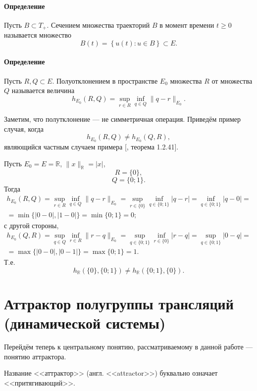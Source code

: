 \paragraph{Определение}

Пусть $B \subset T_+$.
Сечением множества траекторий $B$ в момент времени $t \geq 0$ называется множество
$$
	B(t)=\left\{u(t) : u \in B \right\} \subset E.
$$


\paragraph{Определение}

Пусть $R,Q \subset E$.
Полуотклонением в пространстве $E_0$ множества $R$ от множества $Q$ называется величина
$$
	h_{E_0}(R,Q) = \sup_{r\in R} \inf_{q \in Q} \| q - r \|_{E_0}.
$$

Заметим, что полутклонение --- не симметричная операция.
Приведём пример случая, когда
$$
	h_{E_0}(R,Q) \neq h_{E_0}(Q,R),
$$
являющийся частным случаем примера [\cite{mnogozn}, теорема 1.2.41].

Пусть $E_0 = E = \mathbb{R}$, $\|x\|_{\mathbb{R}} = |x|$,
$$
	R =\{0\},
$$
$$
	Q=\{0;1\}.
$$
Тогда
\begin{multline*}
	h_{E_0}(R,Q) =
	\sup_{r\in R} \inf_{q \in Q} \| q - r \|_{E_0} =
	\sup_{r\in \{0\}} \inf_{q \in \{0;1\}} | q - r | =
	\inf_{q \in \{0;1\}} | q - 0 | =
	\\ =
	\min\{|0-0|,|1-0|\} =
	\min\{0;1\} =
	0;
\end{multline*}
с другой стороны,
\begin{multline*}
	h_{E_0}(Q,R) =
	\sup_{q \in Q} \inf_{r\in R} \| r - q \|_{E_0} =
	\sup_{q \in \{0;1\}} \inf_{r\in \{0\}} | r - q | =
	\sup_{q \in \{0;1\}} | 0 - q | =
	\\ =
	\max\{|0-0|,|0-1|\} =
	\max\{0;1\} =
	1.
\end{multline*}
Т.е.
$$
	h_{\mathbb{R}}\left( \{0\}, \{0;1\}\right) \neq h_{\mathbb{R}}\left( \{0;1\} , \{0\} \right).
$$


\section{Аттрактор полугруппы трансляций (динамической системы)}

Перейдём теперь к центральному понятию, рассматриваемому в данной работе --- понятию аттрактора.

Название <<аттрактор>> (англ. <<attractor>>) буквально означает <<притягивающий>>.



